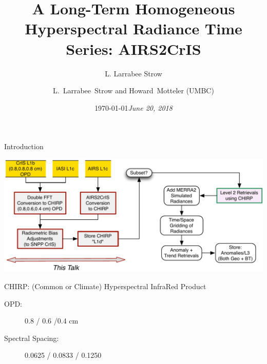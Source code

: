 \documentclass[10pt,t]{beamer}
\author{L. Larrabee Strow}
\date{\today}
\title{\large A Long-Term Homogeneous Hyperspectral Radiance Time Series: AIRS2CrIS}
\date{\textit{\footnotesize June 20, 2018}}
\author{L.~Larrabee~Strow and Howard~Motteler (UMBC)}
\begin{document}
\maketitle
{}

\begin{frame}[label={sec:org6d1c397}]{Introduction}
\vspace{-0.2in}
\begin{center}
\includegraphics[width=1.0\linewidth]{./Figs/Pdf/airs2cris_stm_talk1_landscape.pdf}
\end{center}

\begin{block}{CHIRP: (Common or Climate) Hyperspectral InfraRed Product}
\begin{description}
\item[{OPD:}] 0.8 / 0.6 /0.4 cm
\item[{Spectral Spacing:}] 0.0625 / 0.0833 / 0.1250 \wn
\end{description}
\end{block}
\end{frame}
\end{document}
